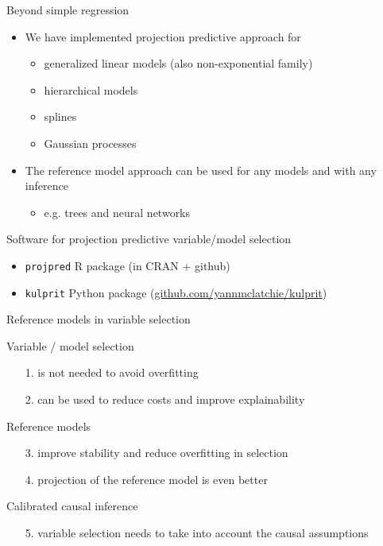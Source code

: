 \documentclass[english,t]{beamer}
\begin{document}
\begin{frame}{Beyond simple regression}

  \begin{itemize}
  \item We have implemented projection predictive approach for
    \begin{itemize}
    \item generalized linear models (also non-exponential family)
    \item hierarchical models
    \item splines
    \item Gaussian processes
    \end{itemize}
  \item<2-> The reference model approach can be used for any models
    and with any inference
    \begin{itemize}
    \item e.g. trees and neural networks
    \end{itemize}
  \end{itemize}

\end{frame}

\begin{frame}{Software for projection predictive variable/model selection}

  \begin{itemize}
  \item \texttt{projpred} R package (in CRAN + github)
  \item \texttt{kulprit} Python package (\url{github.com/yannmclatchie/kulprit})
  \end{itemize}

\end{frame}

\begin{frame}{Reference models in variable selection}

  Variable / model selection
  \begin{itemize}
  \item[1.] is not needed to avoid overfitting
  \item[2.] can be used to reduce costs and improve explainability
  \end{itemize}

  Reference models
  \begin{itemize}
  \item[3.] improve stability and reduce overfitting in selection
  \item[4.] projection of the reference model is even better
  \end{itemize}

  Calibrated causal inference
  \begin{itemize}
  \item[5.] variable selection needs
    to take into account the causal assumptions
  \end{itemize}

\end{frame}
\end{document}
